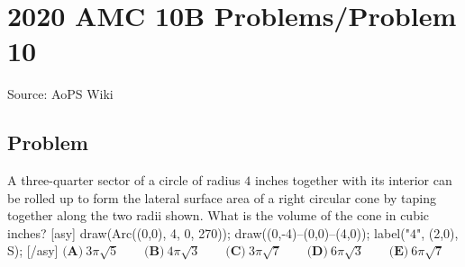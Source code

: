\documentclass[12pt]{article}
\begin{document}
\section*{{2020 AMC 10B Problems/Problem 10}}
Source: AoPS Wiki

\subsection*{Problem}
A three-quarter sector of a circle of radius $4$ inches together with its interior can be rolled up to form the lateral surface area of a right circular cone by taping together along the two radii shown. What is the volume of the cone in cubic inches? [asy] draw(Arc((0,0), 4, 0, 270)); draw((0,-4)--(0,0)--(4,0)); label("$4$", (2,0), S); [/asy] $\textbf{(A)}\ 3\pi \sqrt5 \qquad\textbf{(B)}\ 4\pi \sqrt3 \qquad\textbf{(C)}\ 3 \pi \sqrt7 \qquad\textbf{(D)}\ 6\pi \sqrt3 \qquad\textbf{(E)}\ 6\pi \sqrt7$
\end{document}
